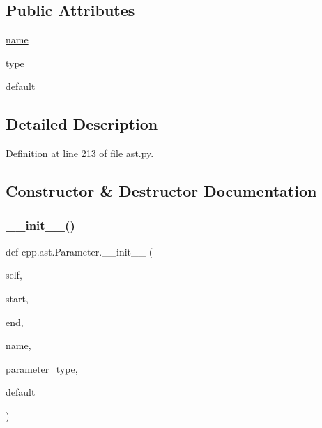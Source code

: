 \subsection*{Public Attributes}
\begin{DoxyCompactItemize}
\item 
\hyperlink{classcpp_1_1ast_1_1Parameter_aae0375fb0ded8fa9090feea6bdff2784}{name}
\item 
\hyperlink{classcpp_1_1ast_1_1Parameter_a5eed090000c41551a10c21f175ad33e3}{type}
\item 
\hyperlink{classcpp_1_1ast_1_1Parameter_a4ceae2ac87d82c5542c4e7385eb4c97e}{default}
\end{DoxyCompactItemize}


\subsection{Detailed Description}


Definition at line 213 of file ast.\+py.



\subsection{Constructor \& Destructor Documentation}
\mbox{\label{classcpp_1_1ast_1_1Parameter_a4fe27f559d44adac9e9b5898ba76c5b3}} 
\subsubsection{\texorpdfstring{\+\_\+\+\_\+init\+\_\+\+\_\+()}{\_\_init\_\_()}}
{\footnotesize\ttfamily def cpp.\+ast.\+Parameter.\+\_\+\+\_\+init\+\_\+\+\_\+ (\begin{DoxyParamCaption}\item[{}]{self,  }\item[{}]{start,  }\item[{}]{end,  }\item[{}]{name,  }\item[{}]{parameter\+\_\+type,  }\item[{}]{default }\end{DoxyParamCaption})}



